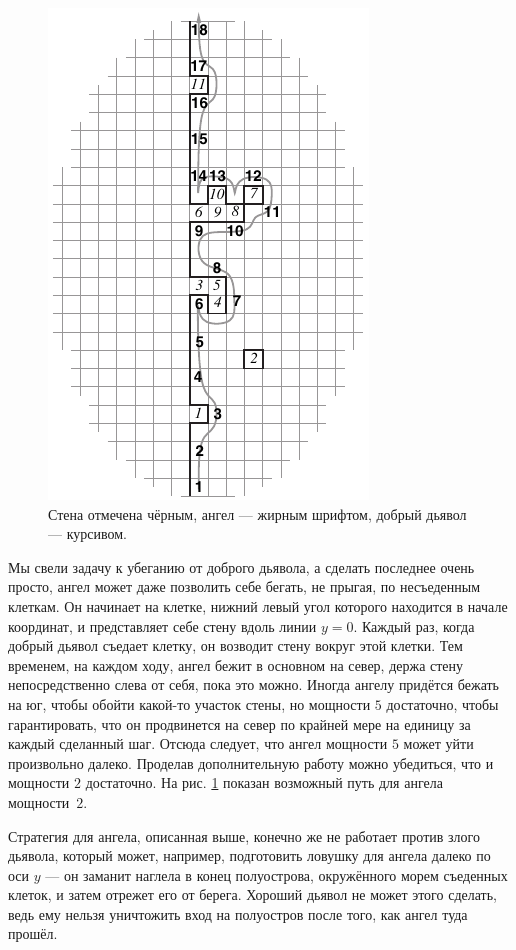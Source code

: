 \begin{figure}[htb!]
\centering
\includegraphics[scale=1]{pics/angel}
\caption{Стена отмечена чёрным, ангел --- жирным шрифтом, добрый дьявол --- курсивом.}
\label{pic:angel}
\end{figure}

Мы свели задачу к убеганию от доброго дьявола, а сделать последнее очень просто,
ангел может даже позволить себе бегать, не прыгая, по несъеденным клеткам.
Он начинает на клетке, нижний левый угол которого находится в начале координат, и представляет себе стену вдоль линии $y = 0$.
Каждый раз, когда добрый дьявол съедает клетку, он возводит стену вокруг этой клетки.
Тем временем, на каждом ходу, ангел бежит в основном на север, держа стену непосредственно слева от себя, пока это можно.
Иногда ангелу придётся бежать на юг, чтобы обойти какой-то участок стены, но мощности $5$ достаточно, чтобы гарантировать, что он продвинется на север по крайней мере на единицу за каждый сделанный шаг.
Отсюда следует, что ангел мощности $5$ может уйти произвольно далеко.
Проделав дополнительную работу можно убедиться, что и мощности $2$ достаточно.
На рис. \ref{pic:angel} показан возможный путь для ангела мощности~$2$.

Стратегия для ангела, описанная выше, конечно же не работает против злого дьявола, который может, например, подготовить ловушку для ангела далеко по оси $y$ --- он заманит наглела в конец полуострова, окружённого морем съеденных клеток, и затем отрежет его от берега.
Хороший дьявол не может этого сделать, ведь ему нельзя уничтожить вход на полуостров после того, как ангел туда прошёл.

